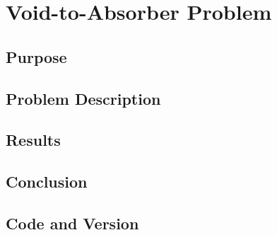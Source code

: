 \section{Void-to-Absorber Problem}

\subsection{Purpose}

\subsection{Problem Description}

\subsection{Results}

\subsection{Conclusion}

\subsection{Code and Version}
